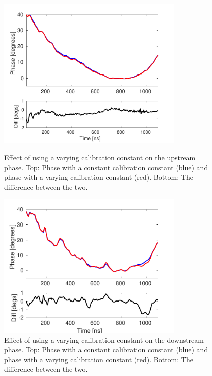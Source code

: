 

\begin{figure}
  \centering
  \includegraphics[width=0.8\textwidth]{Figures/phaseMons/multiSampMon2Along}
  \caption{Effect of using a varying calibration constant on the upstream phase. Top: Phase with a constant calibration constant (blue) and phase with a varying calibration constant (red). Bottom: The difference between the two.}
  \label{f:multiSampMon2Along}
  \includegraphics[width=0.8\textwidth]{Figures/phaseMons/multiSampMon3Along}
  \caption{Effect of using a varying calibration constant on the downstream phase. Top: Phase with a constant calibration constant (blue) and phase with a varying calibration constant (red). Bottom: The difference between the two.}
  \label{f:multiSampMon3Along}
\end{figure}

